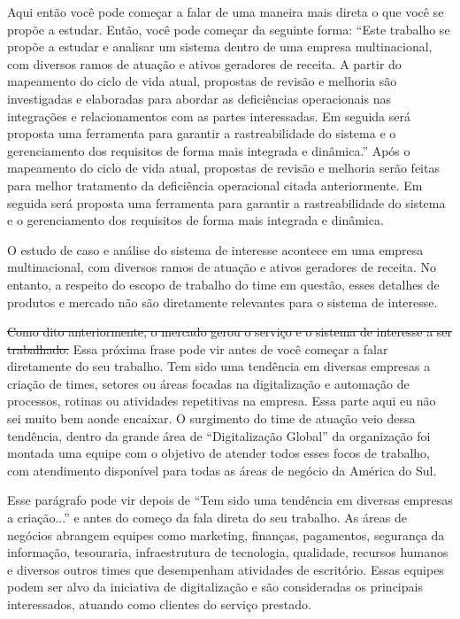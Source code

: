	{\color{red} Aqui então você pode começar a falar de uma maneira mais direta o que você se propõe a estudar. Então, você pode começar da seguinte forma: ``Este trabalho se propõe a estudar e analisar um sistema dentro de uma empresa multinacional, com diversos ramos de atuação e ativos geradores de receita. A partir do mapeamento do ciclo de vida atual, propostas de revisão e melhoria são investigadas e elaboradas para abordar as deficiências operacionais nas integrações e relacionamentos com as partes interessadas. Em seguida será proposta uma ferramenta para garantir a rastreabilidade do sistema e o gerenciamento dos requisitos de forma mais integrada e dinâmica.''} Após o mapeamento do ciclo de vida atual, propostas de revisão e melhoria serão feitas para melhor tratamento da deficiência operacional citada anteriormente. Em  seguida será proposta uma ferramenta para garantir a rastreabilidade do sistema e o gerenciamento dos requisitos de forma mais integrada e dinâmica. 

	O estudo de caso e análise do sistema de interesse acontece em uma empresa 
	multinacional, com diversos ramos de atuação e ativos geradores de receita. No 
	entanto, a respeito do escopo de trabalho do time em questão, esses detalhes de 
	produtos e mercado não são diretamente relevantes para o sistema de interesse. 

	\sout{Como dito anteriormente, o mercado gerou o serviço e o sistema de interesse a ser trabalhado.} {\color{red} Essa próxima frase pode vir antes de você começar a falar diretamente do seu trabalho.} Tem sido uma tendência em diversas empresas a criação de times, setores ou áreas focadas na digitalização e automação de processos, rotinas ou 
	atividades repetitivas na empresa. {\color{red} Essa parte aqui eu não sei muito bem aonde encaixar.} O surgimento do time de atuação veio dessa tendência, dentro da grande área de ``Digitalização Global'' da organização foi montada uma equipe com o objetivo de atender todos esses focos de trabalho, com atendimento disponível para todas as áreas de negócio da América do Sul. 

	{\color{red} Esse parágrafo pode vir depois de ``Tem sido uma tendência em diversas empresas a criação...'' e antes do começo da fala direta do seu trabalho.} As áreas de negócios abrangem equipes como marketing, finanças, pagamentos, segurança da informação, tesouraria, infraestrutura de tecnologia, qualidade, recursos humanos e diversos outros times que desempenham atividades de escritório. Essas equipes podem ser alvo da iniciativa de digitalização e são consideradas os principais interessados, atuando como clientes do serviço prestado.

